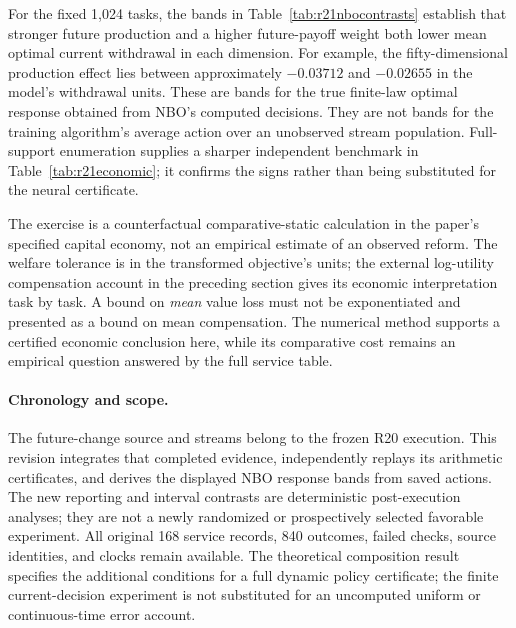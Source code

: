 
For the fixed 1,024 tasks, the bands in Table~\ref{tab:r21nbocontrasts}
establish that stronger future production and a higher future-payoff weight
both lower mean optimal current withdrawal in each dimension. For example,
the fifty-dimensional production effect lies between approximately $-0.03712$
and $-0.02655$ in the model's withdrawal units. These are bands for the true
finite-law optimal response obtained from NBO's computed decisions. They
are not bands for the training algorithm's average action over an unobserved
stream population. Full-support enumeration supplies a sharper independent
benchmark in Table~\ref{tab:r21economic}; it confirms the signs rather than
being substituted for the neural certificate.

The exercise is a counterfactual comparative-static calculation in the
paper's specified capital economy, not an empirical estimate of an observed
reform. The welfare tolerance is in the transformed objective's units; the
external log-utility compensation account in the preceding section gives
its economic interpretation task by task. A bound on \emph{mean} value loss
must not be exponentiated and presented as a bound on mean compensation.
The numerical method supports a certified economic conclusion here, while
its comparative cost remains an empirical question answered by the full
service table.

\paragraph{Chronology and scope.}
The future-change source and streams belong to the frozen R20 execution.
This revision integrates that completed evidence, independently replays its
arithmetic certificates, and derives the displayed NBO response bands from
saved actions. The new reporting and interval contrasts are deterministic
post-execution analyses; they are not a newly randomized or prospectively
selected favorable experiment. All original 168 service records, 840 outcomes,
failed checks, source identities, and clocks remain available. The theoretical
composition result specifies the additional conditions for a full dynamic
policy certificate; the finite current-decision experiment is not substituted
for an uncomputed uniform or continuous-time error account.
